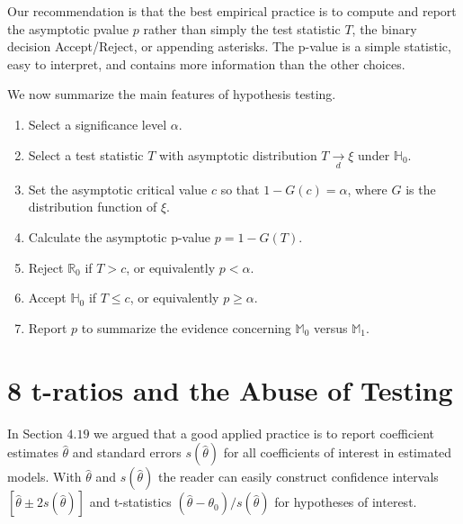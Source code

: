 \documentclass[10pt]{article}
\begin{document}
Our recommendation is that the best empirical practice is to compute and report the asymptotic pvalue $p$ rather than simply the test statistic $T$, the binary decision Accept/Reject, or appending asterisks. The p-value is a simple statistic, easy to interpret, and contains more information than the other choices.

We now summarize the main features of hypothesis testing.

\begin{enumerate}
  \item Select a significance level $\alpha$.

  \item Select a test statistic $T$ with asymptotic distribution $T \underset{d}{\rightarrow} \xi$ under $\mathbb{H}_{0}$.

  \item Set the asymptotic critical value $c$ so that $1-G(c)=\alpha$, where $G$ is the distribution function of $\xi$.

  \item Calculate the asymptotic p-value $p=1-G(T)$.

  \item Reject $\mathbb{R}_{0}$ if $T>c$, or equivalently $p<\alpha$.

  \item Accept $\mathbb{H}_{0}$ if $T \leq c$, or equivalently $p \geq \alpha$.

  \item Report $p$ to summarize the evidence concerning $\mathbb{M}_{0}$ versus $\mathbb{M}_{1}$.

\end{enumerate}
\section{8 t-ratios and the Abuse of Testing}
In Section $4.19$ we argued that a good applied practice is to report coefficient estimates $\widehat{\theta}$ and standard errors $s(\widehat{\theta})$ for all coefficients of interest in estimated models. With $\widehat{\theta}$ and $s(\widehat{\theta})$ the reader can easily construct confidence intervals $[\widehat{\theta} \pm 2 s(\widehat{\theta})]$ and t-statistics $\left(\widehat{\theta}-\theta_{0}\right) / s(\widehat{\theta})$ for hypotheses of interest.
\end{document}

